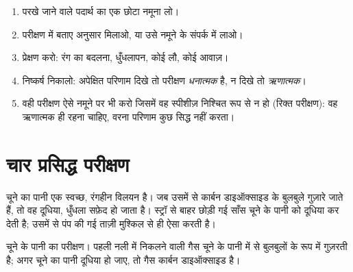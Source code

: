 \begin{method}[अभिलाक्षणिक परीक्षण करना]\label{met:g7:identifying-substances:run}
\begin{enumerate}
  \item परखे जाने वाले पदार्थ का एक छोटा नमूना लो।
  \item परीक्षण में बताए अनुसार  मिलाओ, या उसे नमूने के संपर्क
        में लाओ।
  \item प्रेक्षण करो: रंग का बदलना, धुँधलापन, कोई लौ, कोई आवाज़।
  \item निष्कर्ष निकालो: अपेक्षित परिणाम दिखे तो परीक्षण \emph{धनात्मक}
        है, न दिखे तो \emph{ऋणात्मक}।
  \item वही परीक्षण ऐसे नमूने पर भी करो जिसमें वह स्पीशीज़ निश्चित रूप से
        न हो (रिक्त परीक्षण): वह ऋणात्मक ही रहना चाहिए, वरना परिणाम कुछ
        सिद्ध नहीं करता।
\end{enumerate}
\end{method}

\section{चार प्रसिद्ध परीक्षण}

\begin{proposition}[कार्बन डाइऑक्साइड चूने के पानी को दूधिया कर देती है]\label{prop:g7:identifying-substances:limewater}
चूने का पानी एक स्वच्छ, रंगहीन विलयन है। जब उसमें से कार्बन डाइऑक्साइड के
बुलबुले गुज़ारे जाते हैं, तो वह दूधिया, धुँधला सफ़ेद हो जाता है। स्ट्रॉ से
बाहर छोड़ी गई साँस चूने के पानी को दूधिया कर देती है; उसमें से पंप की गई
ताज़ी  मुश्किल से ही ऐसा करती है।
\end{proposition}

\begin{omfigure}

{\small चूने के पानी का परीक्षण। पहली नली में निकलने वाली गैस चूने के पानी
में से बुलबुलों के रूप में गुज़रती है; अगर चूने का पानी दूधिया हो जाए, तो
गैस कार्बन डाइऑक्साइड है।}
\end{omfigure}

